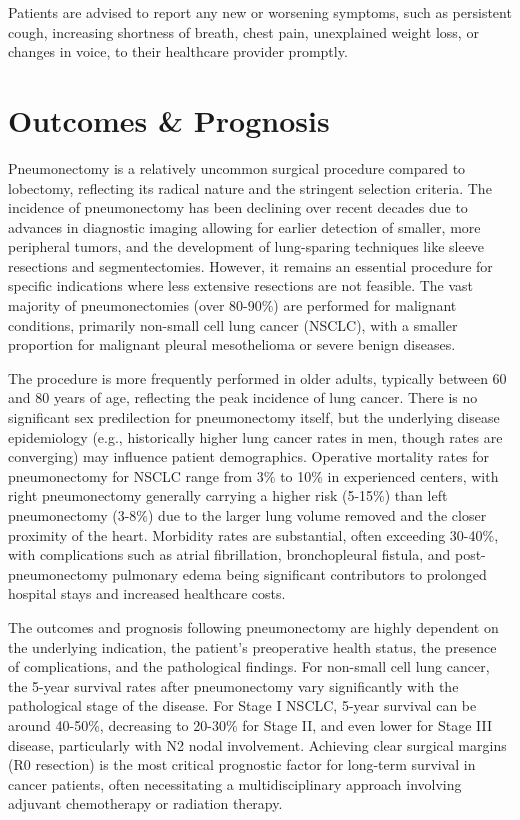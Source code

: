 Patients are advised to report any new or worsening symptoms, such as persistent cough, increasing shortness of breath, chest pain, unexplained weight loss, or changes in voice, to their healthcare provider promptly.

\section*{Outcomes \& Prognosis}
Pneumonectomy is a relatively uncommon surgical procedure compared to lobectomy, reflecting its radical nature and the stringent selection criteria. The incidence of pneumonectomy has been declining over recent decades due to advances in diagnostic imaging allowing for earlier detection of smaller, more peripheral tumors, and the development of lung-sparing techniques like sleeve resections and segmentectomies. However, it remains an essential procedure for specific indications where less extensive resections are not feasible. The vast majority of pneumonectomies (over 80-90\%) are performed for malignant conditions, primarily non-small cell lung cancer (NSCLC), with a smaller proportion for malignant pleural mesothelioma or severe benign diseases.

The procedure is more frequently performed in older adults, typically between 60 and 80 years of age, reflecting the peak incidence of lung cancer. There is no significant sex predilection for pneumonectomy itself, but the underlying disease epidemiology (e.g., historically higher lung cancer rates in men, though rates are converging) may influence patient demographics. Operative mortality rates for pneumonectomy for NSCLC range from 3\% to 10\% in experienced centers, with right pneumonectomy generally carrying a higher risk (5-15\%) than left pneumonectomy (3-8\%) due to the larger lung volume removed and the closer proximity of the heart. Morbidity rates are substantial, often exceeding 30-40\%, with complications such as atrial fibrillation, bronchopleural fistula, and post-pneumonectomy pulmonary edema being significant contributors to prolonged hospital stays and increased healthcare costs.

The outcomes and prognosis following pneumonectomy are highly dependent on the underlying indication, the patient's preoperative health status, the presence of complications, and the pathological findings. For non-small cell lung cancer, the 5-year survival rates after pneumonectomy vary significantly with the pathological stage of the disease. For Stage I NSCLC, 5-year survival can be around 40-50\%, decreasing to 20-30\% for Stage II, and even lower for Stage III disease, particularly with N2 nodal involvement. Achieving clear surgical margins (R0 resection) is the most critical prognostic factor for long-term survival in cancer patients, often necessitating a multidisciplinary approach involving adjuvant chemotherapy or radiation therapy.

